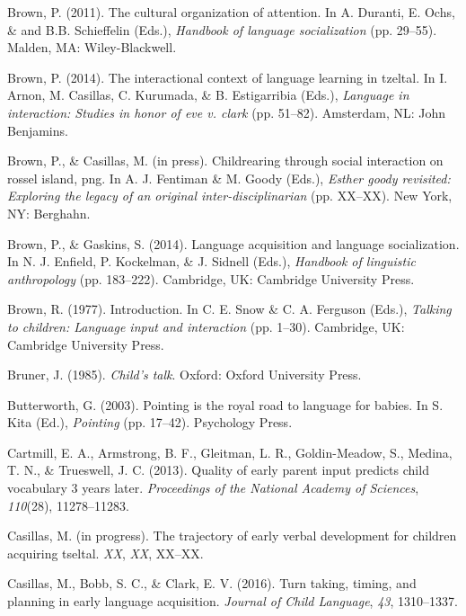 \documentclass[floatsintext,man]{apa6}
\theoremstyle{definition}
\theoremstyle{definition}
\theoremstyle{definition}
\theoremstyle{remark}
\begin{document}
\hypertarget{ref-brown2011cultural}{}
Brown, P. (2011). The cultural organization of attention. In A. Duranti,
E. Ochs, \& and B.B. Schieffelin (Eds.), \emph{Handbook of language
socialization} (pp. 29--55). Malden, MA: Wiley-Blackwell.

\hypertarget{ref-brown2014interactional}{}
Brown, P. (2014). The interactional context of language learning in
tzeltal. In I. Arnon, M. Casillas, C. Kurumada, \& B. Estigarribia
(Eds.), \emph{Language in interaction: Studies in honor of eve v. clark}
(pp. 51--82). Amsterdam, NL: John Benjamins.

\hypertarget{ref-brownIPchildrearing}{}
Brown, P., \& Casillas, M. (in press). Childrearing through social
interaction on rossel island, png. In A. J. Fentiman \& M. Goody (Eds.),
\emph{Esther goody revisited: Exploring the legacy of an original
inter-disciplinarian} (pp. XX--XX). New York, NY: Berghahn.

\hypertarget{ref-brown2014language}{}
Brown, P., \& Gaskins, S. (2014). Language acquisition and language
socialization. In N. J. Enfield, P. Kockelman, \& J. Sidnell (Eds.),
\emph{Handbook of linguistic anthropology} (pp. 183--222). Cambridge,
UK: Cambridge University Press.

\hypertarget{ref-brown1997introduction}{}
Brown, R. (1977). Introduction. In C. E. Snow \& C. A. Ferguson (Eds.),
\emph{Talking to children: Language input and interaction} (pp. 1--30).
Cambridge, UK: Cambridge University Press.

\hypertarget{ref-bruner1985childs}{}
Bruner, J. (1985). \emph{Child's talk}. Oxford: Oxford University Press.

\hypertarget{ref-butterworth2003pointing}{}
Butterworth, G. (2003). Pointing is the royal road to language for
babies. In S. Kita (Ed.), \emph{Pointing} (pp. 17--42). Psychology
Press.

\hypertarget{ref-cartmill2013quality}{}
Cartmill, E. A., Armstrong, B. F., Gleitman, L. R., Goldin-Meadow, S.,
Medina, T. N., \& Trueswell, J. C. (2013). Quality of early parent input
predicts child vocabulary 3 years later. \emph{Proceedings of the
National Academy of Sciences}, \emph{110}(28), 11278--11283.

\hypertarget{ref-casillasIPtrajectory}{}
Casillas, M. (in progress). The trajectory of early verbal development
for children acquiring tseltal. \emph{XX}, \emph{XX}, XX--XX.

\hypertarget{ref-casillas2016turn}{}
Casillas, M., Bobb, S. C., \& Clark, E. V. (2016). Turn taking, timing,
and planning in early language acquisition. \emph{Journal of Child
Language}, \emph{43}, 1310--1337.
\end{document}
